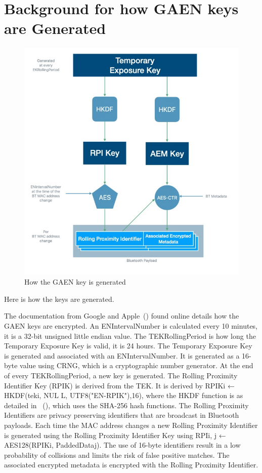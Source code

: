 \section{Background for how GAEN keys are Generated}
\label{sec:BackgroundGAENKeysGeneration}
\begin{figure}
    \includegraphics[width=\linewidth]{generatedKEY.jpg}
    \caption{How the GAEN key is generated}
    \label{fig:keyGeneration}
\end{figure}

Here is how the keys are generated. 

The documentation from Google and Apple~(\cite{appleCrypto}) found online details how the GAEN keys are encrypted. An ENIntervalNumber is calculated every 10 minutes, it is a 32-bit unsigned little endian value. The TEKRollingPeriod is how long the Temporary Exposure Key is valid, it is 24 hours. The Temporary Exposure Key is generated and associated with an ENIntervalNumber. It is generated as a 16-byte value using CRNG, which is a cryptographic number generator. At the end of every TEKRollingPeriod, a new key is generated. The Rolling Proximity Identifier Key (RPIK) is derived from the TEK. It is derived by RPIKi ← HKDF(teki, NUL L, UTF8("EN-RPIK"),16), where the HKDF function is as detailed in ~(\cite{rfc5869}), which uses the SHA-256 hash functions. The Rolling Proximity Identifiers are privacy preserving identifiers that are broadcast in Bluetooth payloads. Each time the MAC address changes a new Rolling Proximity Identifier is generated using the Rolling Proximity Identifier Key using RPIi, j ← AES128(RPIKi, PaddedDataj). The use of 16-byte identifiers result in a low probability of collisions and limits the risk of false positive matches. The associated encrypted metadata is encrypted with the Rolling Proximity Identifier.


